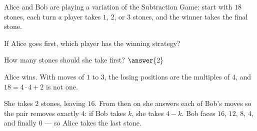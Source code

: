 \documentclass[12pt]{ximera}
\begin{document}
\begin{problem}
Alice and Bob are playing a variation of the Subtraction Game: start with $18$ stones,
each turn a player takes $1$, $2$, or $3$ stones, and the winner takes the final stone.

\begin{prompt}
If Alice goes first, which player has the winning strategy?

\begin{multipleChoice}
\end{multipleChoice}

How many stones should she take first? $\answer{2}$

\begin{feedback}
Alice wins. With moves of $1$ to $3$, the losing positions are the multiples of $4$, and
$18 = 4\cdot 4 + 2$ is not one.

She takes $2$ stones, leaving $16$. From then on she answers each of Bob's moves so the
pair removes exactly $4$: if Bob takes $k$, she takes $4-k$. Bob faces $16$, $12$, $8$,
$4$, and finally $0$ --- so Alice takes the last stone.
\end{feedback}
\end{prompt}
\end{problem}
\end{document}
